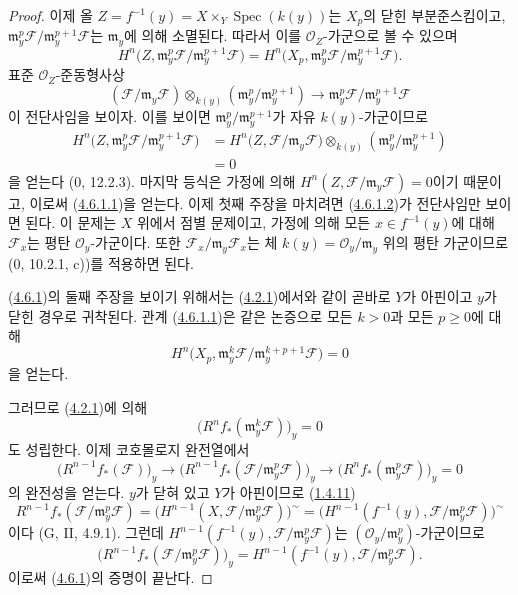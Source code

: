 \begin{proof}
이제 올
$Z=f^{-1}(y)=X\times_Y\operatorname{Spec}(k(y))$는 $X_p$의 닫힌
부분준스킴이고,
$\mathfrak m_y^p\mathcal F/\mathfrak m_y^{p+1}\mathcal F$는
$\mathfrak m_y$에 의해 소멸된다. 따라서 이를 $\mathcal O_Z$-가군으로
볼 수 있으며
\[
H^n\bigl(Z,\mathfrak m_y^p\mathcal F/
\mathfrak m_y^{p+1}\mathcal F\bigr)
=H^n\bigl(X_p,\mathfrak m_y^p\mathcal F/
\mathfrak m_y^{p+1}\mathcal F\bigr).
\]
표준 $\mathcal O_Z$-준동형사상
\[
\label{III.4.6.1.2-fr}
(\mathcal F/\mathfrak m_y\mathcal F)
\otimes_{k(y)}(\mathfrak m_y^p/\mathfrak m_y^{p+1})
\longrightarrow
\mathfrak m_y^p\mathcal F/\mathfrak m_y^{p+1}\mathcal F
\tag{4.6.1.2}
\]
이 전단사임을 보이자. 이를 보이면
$\mathfrak m_y^p/\mathfrak m_y^{p+1}$가 자유 $k(y)$-가군이므로
\[
\begin{split}
H^n\bigl(Z,\mathfrak m_y^p\mathcal F/
\mathfrak m_y^{p+1}\mathcal F\bigr)
&=H^n\bigl(Z,\mathcal F/\mathfrak m_y\mathcal F\bigr)
\otimes_{k(y)}(\mathfrak m_y^p/\mathfrak m_y^{p+1})\\
&=0
\end{split}
\]
을 얻는다 (0, 12.2.3). 마지막 등식은 가정에 의해
$H^n(Z,\mathcal F/\mathfrak m_y\mathcal F)=0$이기 때문이고, 이로써
(\hyperref[III.4.6.1.1-fr]{4.6.1.1})을 얻는다. 이제 첫째 주장을
마치려면 (\hyperref[III.4.6.1.2-fr]{4.6.1.2})가 전단사임만 보이면
된다. 이 문제는 $X$ 위에서 점별 문제이고, 가정에 의해 모든
$x\in f^{-1}(y)$에 대해 $\mathcal F_x$는 평탄
$\mathcal O_y$-가군이다. 또한
$\mathcal F_x/\mathfrak m_y\mathcal F_x$는 체
$k(y)=\mathcal O_y/\mathfrak m_y$ 위의 평탄 가군이므로
(0, 10.2.1, c))를 적용하면 된다.

(\hyperref[III.4.6.1-fr]{4.6.1})의 둘째 주장을 보이기 위해서는
(\hyperref[III.4.2.1-fr]{4.2.1})에서와 같이 곧바로 $Y$가 아핀이고
$y$가 닫힌 경우로 귀착된다. 관계
(\hyperref[III.4.6.1.1-fr]{4.6.1.1})은 같은 논증으로 모든 $k>0$과
모든 $p\geq0$에 대해
\[
\label{III.4.6.1.3-fr}
H^n\bigl(X_p,
\mathfrak m_y^k\mathcal F/
\mathfrak m_y^{k+p+1}\mathcal F\bigr)=0
\tag{4.6.1.3}
\]
을 얻는다.


그러므로 (\hyperref[III.4.2.1-fr]{4.2.1})에 의해
\[
\label{III.4.6.1.4-fr}
\bigl(R^nf_*(\mathfrak m_y^k\mathcal F)\bigr)_y=0
\tag{4.6.1.4}
\]
도 성립한다. 이제 코호몰로지 완전열에서
\[
\bigl(R^{n-1}f_*(\mathcal F)\bigr)_y
\longrightarrow
\bigl(R^{n-1}f_*(\mathcal F/\mathfrak m_y^p\mathcal F)\bigr)_y
\longrightarrow
\bigl(R^nf_*(\mathfrak m_y^p\mathcal F)\bigr)_y=0
\]
의 완전성을 얻는다. $y$가 닫혀 있고 $Y$가 아핀이므로
(\hyperref[III.1.4.11-fr]{1.4.11})
\[
R^{n-1}f_*(\mathcal F/\mathfrak m_y^p\mathcal F)
=\bigl(H^{n-1}(X,\mathcal F/\mathfrak m_y^p\mathcal F)\bigr)^\sim
=\bigl(H^{n-1}(f^{-1}(y),
\mathcal F/\mathfrak m_y^p\mathcal F)\bigr)^\sim
\]
이다 (G, II, 4.9.1). 그런데
$H^{n-1}(f^{-1}(y),\mathcal F/\mathfrak m_y^p\mathcal F)$는
$(\mathcal O_y/\mathfrak m_y^p)$-가군이므로
\[
\bigl(R^{n-1}f_*(\mathcal F/\mathfrak m_y^p\mathcal F)\bigr)_y
=H^{n-1}(f^{-1}(y),\mathcal F/\mathfrak m_y^p\mathcal F).
\]
이로써 (\hyperref[III.4.6.1-fr]{4.6.1})의 증명이 끝난다.
\end{proof}

